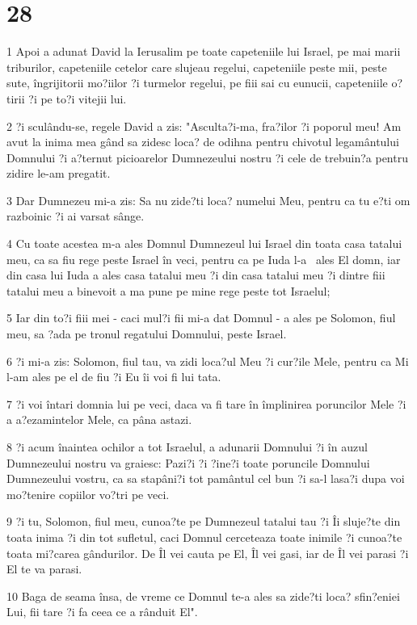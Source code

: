 \chapter{28}

\par 1 Apoi a adunat David la Ierusalim pe toate capeteniile lui Israel, pe mai marii triburilor, capeteniile cetelor care slujeau regelui, capeteniile peste mii, peste sute, îngrijitorii mo?iilor ?i turmelor regelui, pe fiii sai cu eunucii, capeteniile o?tirii ?i pe to?i vitejii lui.
\par 2 ?i sculându-se, regele David a zis: "Asculta?i-ma, fra?ilor ?i poporul meu! Am avut la inima mea gând sa zidesc loca? de odihna pentru chivotul legamântului Domnului ?i a?ternut picioarelor Dumnezeului nostru ?i cele de trebuin?a pentru zidire le-am pregatit.
\par 3 Dar Dumnezeu mi-a zis: Sa nu zide?ti loca? numelui Meu, pentru ca tu e?ti om razboinic ?i ai varsat sânge.
\par 4 Cu toate acestea m-a ales Domnul Dumnezeul lui Israel din toata casa tatalui meu, ca sa fiu rege peste Israel în veci, pentru ca pe Iuda l-a  ales El domn, iar din casa lui Iuda a ales casa tatalui meu ?i din casa tatalui meu ?i dintre fiii tatalui meu a binevoit a ma pune pe mine rege peste tot Israelul;
\par 5 Iar din to?i fiii mei - caci mul?i fii mi-a dat Domnul - a ales pe Solomon, fiul meu, sa ?ada pe tronul regatului Domnului, peste Israel.
\par 6 ?i mi-a zis: Solomon, fiul tau, va zidi loca?ul Meu ?i cur?ile Mele, pentru ca Mi l-am ales pe el de fiu ?i Eu îi voi fi lui tata.
\par 7 ?i voi întari domnia lui pe veci, daca va fi tare în împlinirea poruncilor Mele ?i a a?ezamintelor Mele, ca pâna astazi.
\par 8 ?i acum înaintea ochilor a tot Israelul, a adunarii Domnului ?i în auzul Dumnezeului nostru va graiesc: Pazi?i ?i ?ine?i toate poruncile Domnului Dumnezeului vostru, ca sa stapâni?i tot pamântul cel bun ?i sa-l lasa?i dupa voi mo?tenire copiilor vo?tri pe veci.
\par 9 ?i tu, Solomon, fiul meu, cunoa?te pe Dumnezeul tatalui tau ?i Îi sluje?te din toata inima ?i din tot sufletul, caci Domnul cerceteaza toate inimile ?i cunoa?te toata mi?carea gândurilor. De Îl vei cauta pe El, Îl vei gasi, iar de Îl vei parasi ?i El te va parasi.
\par 10 Baga de seama însa, de vreme ce Domnul te-a ales sa zide?ti loca? sfin?eniei Lui, fii tare ?i fa ceea ce a rânduit El".
